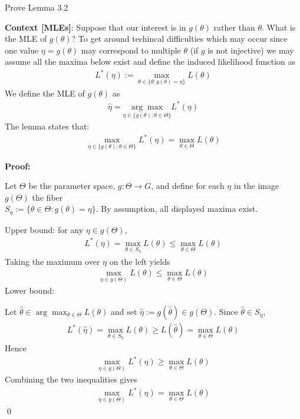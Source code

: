 \documentclass[10pt]{article}
\begin{document}
\hfill 

Prove Lemma 3.2

\textbf{Context [MLEs]}: Suppose that our interest is in $g(\theta)$ rather than $\theta $. What is the MLE of $g(\theta)$? To get around techincal difficulties which may occur since one value $\eta = g(\theta)$ may correspond to multiple $\theta $ (if $g $ is not injective) we may assume all the maxima below exist and define the induced likelihood function as
\begin{gather*}
    L^*(\eta):= \underset{\theta\in\{\theta : g(\theta) = \eta\}}{\max}L(\theta)
\end{gather*}
We define the MLE of $g(\theta)$ as 
\begin{gather*}
    \hat{\eta} = \underset{\eta\in\{g(\theta) : \theta\in\Theta\}}{\arg\max} L^*(\eta)
\end{gather*}
The lemma states that: 
\begin{gather*}
    \underset{\eta\in\{g(\theta) : \theta\in\Theta\}}{\max}L^*(\eta) = \max_{\theta\in\Theta}L(\theta)
\end{gather*}

\textbf{Proof:}

Let $\Theta $ be the parameter space, $g: \Theta\to G $, and define for each $\eta $ in the image $g(\Theta)$ the fiber \\$S_\eta := \{\theta\in\Theta : g(\theta) = \eta\}$. By assumption, all displayed maxima exist. 

Upper bound: for any $\eta \in g(\Theta)$,
\begin{gather*}
    L^*(\eta) = \max_{\theta\in S_\eta}L(\theta) \le \max_{\theta\in\Theta}L(\theta)
\end{gather*}
Taking the maximum over $\eta $ on the left yields
\begin{gather*}
    \max_{\eta\in g(\Theta)}L(\theta) \le\max_{\theta\in\Theta}L(\theta)
\end{gather*}
Lower bound: 

Let $\hat{\theta} \in \arg\max_{\theta\in\Theta}L(\theta)$ and set $\hat{\eta} := g(\hat{\theta})\in g(\Theta)$. Since $\hat{\theta} \in S_{\hat{\eta}}$,
\begin{gather*}
    L^*(\hat{\eta}) = \max_{\theta\in S_{\hat{\eta}}}L(\theta) \ge L(\hat{\theta}) = \max_{\theta\in\Theta}L(\theta)
\end{gather*}
Hence
\begin{gather*}
    \max_{\eta\in g(\Theta)}L^*(\eta) \ge \max_{\theta\in\Theta}L(\theta)
\end{gather*}
Combining the two inequalities gives
\begin{gather*}
    \max_{\eta\in g(\Theta)}L^*(\eta) = \max_{\theta\in\Theta}L(\theta)
\end{gather*}
\qed
\end{document}
